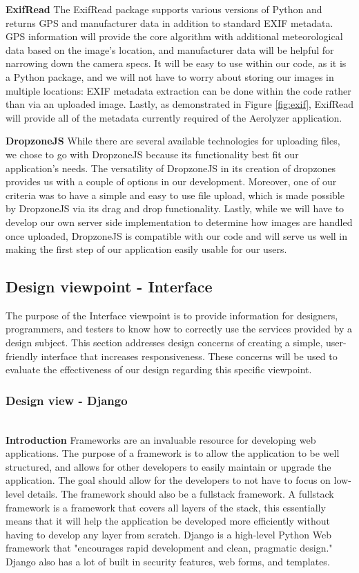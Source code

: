 \documentclass[onecolumn, draftclsnofoot,10pt, compsoc]{IEEEtran}
\begin{document}
\begin{flushleft}
\medskip

\textbf{ExifRead} The ExifRead package supports various versions of Python and returns GPS and manufacturer data in addition to standard EXIF metadata. \cite{18} GPS information will provide the core algorithm with additional meteorological data based on the image's location, and manufacturer data will be helpful for narrowing down the camera specs. It will be easy to use within our code, as it is a Python package, and we will not have to worry about storing our images in multiple locations:  EXIF metadata extraction can be done within the code rather than via an uploaded image. Lastly, as demonstrated in Figure \ref{fig:exif}, ExifRead will provide all of the metadata currently required of the Aerolyzer application.
\medskip

\textbf{DropzoneJS} While there are several available technologies for uploading files, we chose to go with DropzoneJS because its functionality best fit our application’s needs. The versatility of DropzoneJS in its creation of dropzones provides us with a couple of options in our development. Moreover, one of our criteria was to have a simple and easy to use file upload, which is made possible by DropzoneJS via its drag and drop functionality. Lastly, while we will have to develop our own server side implementation to determine how images are handled once uploaded, DropzoneJS is compatible with our code and will serve us well in making the first step of our application easily usable for our users.

\medskip

\subsection{Design viewpoint - Interface}
The purpose of the Interface viewpoint is to provide information for designers, programmers, and testers to know how to correctly use the services provided by a design subject. This section addresses design concerns of creating a simple, user-friendly interface that increases responsiveness. These concerns will be used to evaluate the effectiveness of our design regarding this specific viewpoint.

\subsubsection{Design view - Django}\ \\
\textbf{Introduction} Frameworks are an invaluable resource for developing web applications. The purpose of a framework is to allow the application to be well structured, and allows for other developers to easily maintain or upgrade the application. The goal should allow for the developers to not have to focus on low-level details. The framework should also be a fullstack framework. A fullstack framework is a framework that covers all layers of the stack, this essentially means that it will help the application be developed more efficiently without having to develop any layer from scratch. \cite{8} Django is a high-level Python Web framework that "encourages rapid development and clean, pragmatic design." \cite{8} Django also has a lot of built in security features, web forms, and templates.


\end{flushleft}
\end{document}
